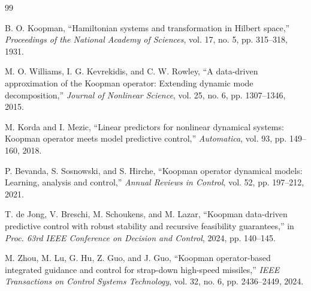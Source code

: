 \documentclass[letterpaper,journal]{IEEEtran}
\begin{document}
\balance
\begin{thebibliography}{99}

B. O. Koopman, ``Hamiltonian systems and transformation in Hilbert space,'' \emph{Proceedings of the National Academy of Sciences}, vol. 17, no. 5, pp. 315--318, 1931.

M. O. Williams, I. G. Kevrekidis, and C. W. Rowley, ``A data-driven approximation of the Koopman operator: Extending dynamic mode decomposition,'' \emph{Journal of Nonlinear Science}, vol. 25, no. 6, pp. 1307--1346, 2015.

M. Korda and I. Mezic, ``Linear predictors for nonlinear dynamical systems: Koopman operator meets model predictive control,'' \emph{Automatica}, vol. 93, pp. 149--160, 2018.

P. Bevanda, S. Sosnowski, and S. Hirche, ``Koopman operator dynamical models: Learning, analysis and control,'' \emph{Annual Reviews in Control}, vol. 52, pp. 197--212, 2021.

T. de Jong, V. Breschi, M. Schoukens, and M. Lazar, ``Koopman data-driven predictive control with robust stability and recursive feasibility guarantees,'' in \emph{Proc. 63rd IEEE Conference on Decision and Control}, 2024, pp. 140--145.

M. Zhou, M. Lu, G. Hu, Z. Guo, and J. Guo, ``Koopman operator-based integrated guidance and control for strap-down high-speed missiles,'' \emph{IEEE Transactions on Control Systems Technology}, vol. 32, no. 6, pp. 2436--2449, 2024.

\end{thebibliography}
\end{document}
